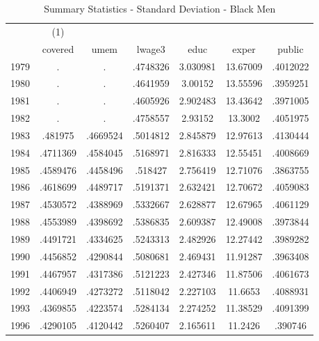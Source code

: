{
\def\sym#1{\ifmmode^{#1}\else\(^{#1}\)\fi}
\begin{longtable}{l*{1}{cccccc}}
\caption{Summary Statistics - Standard Deviation - Black Men}\\
\hline\hline\endfirsthead\hline\endhead\hline\endfoot\endlastfoot
            &\multicolumn{1}{c}{(1)}&            &            &            &            &            \\
            &     covered&        umem&      lwage3&        educ&       exper&      public\\
\hline
1979        &           .&           .&    .4748326&    3.030981&    13.67009&    .4012022\\
1980        &           .&           .&    .4641959&     3.00152&    13.55596&    .3959251\\
1981        &           .&           .&    .4605926&    2.902483&    13.43642&    .3971005\\
1982        &           .&           .&    .4758557&     2.93152&     13.3002&    .4051975\\
1983        &     .481975&    .4669524&    .5014812&    2.845879&    12.97613&    .4130444\\
1984        &    .4711369&    .4584045&    .5168971&    2.816333&    12.55451&    .4008669\\
1985        &    .4589476&    .4458496&     .518427&    2.756419&    12.71076&    .3863755\\
1986        &    .4618699&    .4489717&    .5191371&    2.632421&    12.70672&    .4059083\\
1987        &    .4530572&    .4388969&    .5332667&    2.628877&    12.67965&    .4061129\\
1988        &    .4553989&    .4398692&    .5386835&    2.609387&    12.49008&    .3973844\\
1989        &    .4491721&    .4334625&    .5243313&    2.482926&    12.27442&    .3989282\\
1990        &    .4456852&    .4290844&    .5080681&    2.469431&    11.91287&    .3963408\\
1991        &    .4467957&    .4317386&    .5121223&    2.427346&    11.87506&    .4061673\\
1992        &    .4406949&    .4273272&    .5118042&    2.227103&     11.6653&    .4088931\\
1993        &    .4369855&    .4223574&    .5284134&    2.274252&    11.38529&    .4091399\\
1996        &    .4290105&    .4120442&    .5260407&    2.165611&     11.2426&     .390746\\

\end{longtable}}
